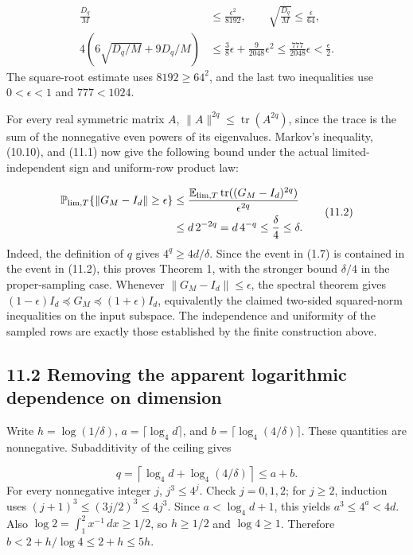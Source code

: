 \documentclass[11pt,a4paper]{article}
\begin{document}
\begin{equation}
\begin{aligned}
\frac{D_q}{M}&\le\frac{\epsilon^2}{8192},
\qquad \sqrt{\frac{D_q}{M}}\le\frac{\epsilon}{64},\\
4\left(6\sqrt{D_q/M}+9D_q/M\right)
&\le\frac38\epsilon+\frac9{2048}\epsilon^2
\le\frac{777}{2048}\epsilon<\frac\epsilon2.
\end{aligned}
\tag{11.1}
\end{equation}
The square-root estimate uses \(8192\ge64^2\), and the last two inequalities use \(0<\epsilon<1\) and \(777<1024\).

For every real symmetric matrix \(A\), \(\|A\|^{2q}\le\operatorname{tr}(A^{2q})\), since the trace is the sum of the nonnegative even powers of its eigenvalues. Markov's inequality, (10.10), and (11.1) now give the following bound under the actual limited-independent sign and uniform-row product law:

\begin{equation}
\begin{aligned}
\mathbb P_{{\rm lim},T}\{\|G_M-I_d\|\ge\epsilon\}
&\le\frac{\mathbb E_{{\rm lim},T}\operatorname{tr}((G_M-I_d)^{2q})}{\epsilon^{2q}}\\
&\le d\,2^{-2q}=d\,4^{-q}\le\frac\delta4\le\delta.
\end{aligned}
\tag{11.2}
\end{equation}
Indeed, the definition of \(q\) gives \(4^q\ge4d/\delta\). Since the event in (1.7) is contained in the event in (11.2), this proves Theorem 1, with the stronger bound \(\delta/4\) in the proper-sampling case. Whenever \(\|G_M-I_d\|\le\epsilon\), the spectral theorem gives \((1-\epsilon)I_d\preceq G_M\preceq(1+\epsilon)I_d\), equivalently the claimed two-sided squared-norm inequalities on the input subspace. The independence and uniformity of the sampled rows are exactly those established by the finite construction above.

\subsection*{11.2 Removing the apparent logarithmic dependence on dimension}
Write \(h=\log(1/\delta)\), \(a=\lceil\log_4 d\rceil\), and \(b=\lceil\log_4(4/\delta)\rceil\). These quantities are nonnegative. Subadditivity of the ceiling gives

\begin{equation}
q=\left\lceil\log_4 d+\log_4(4/\delta)\right\rceil
\le a+b.
\tag{11.3}
\end{equation}
For every nonnegative integer \(j\), \(j^3\le4^j\). Check \(j=0,1,2\); for \(j\ge2\), induction uses \((j+1)^3\le(3j/2)^3\le4j^3\). Since \(a<\log_4 d+1\), this yields \(a^3\le4^a<4d\). Also \(\log2=\int_1^2 x^{-1}\,dx\ge1/2\), so \(h\ge1/2\) and \(\log4\ge1\). Therefore \(b<2+h/\log4\le2+h\le5h\).
\end{document}
